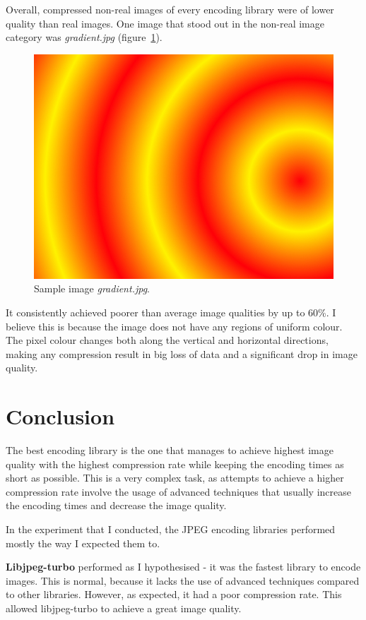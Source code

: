 \documentclass[12pt]{article}
\begin{document}
Overall, compressed non-real images of every encoding library were of lower quality than real images. One image that stood out in the non-real image category was \textit{gradient.jpg} (figure~\ref{gradientImage}).
\begin{figure}[H]
	\centering
	\includegraphics[scale=0.5]{gradient.jpg}
	\caption{Sample image \textit{gradient.jpg}.}
	\label{gradientImage}
\end{figure}
It consistently achieved poorer than average image qualities by up to 60\%. I believe this is because the image does not have any regions of uniform colour. The pixel colour changes both along the vertical and horizontal directions, making any compression result in big loss of data and a significant drop in image quality.
\clearpage
\section{Conclusion}
The best encoding library is the one that manages to achieve highest image quality with the highest compression rate while keeping the encoding times as short as possible. This is a very complex task, as attempts to achieve a higher compression rate involve the usage of advanced techniques that usually increase the encoding times and decrease the image quality.

In the experiment that I conducted, the JPEG encoding libraries performed mostly the way I expected them to.

\textbf{Libjpeg-turbo} performed as I hypothesised - it was the fastest library to encode images. This is normal, because it lacks the use of advanced techniques compared to other libraries. However, as expected, it had a poor compression rate. This allowed libjpeg-turbo to achieve a great image quality.
\end{document}
